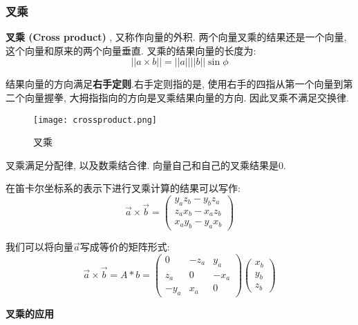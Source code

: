 \documentclass[openany]{progbookcn}
\begin{document}
\subsubsection{叉乘}

\textbf{叉乘 (Cross product) }, 又称作向量的外积. 两个向量叉乘的结果还是一个向量, 这个向量和原来的两个向量垂直. 叉乘的结果向量的长度为: 
\begin{equation}
	||a\times b||=||a||||b||\sin\phi
\end{equation}

结果向量的方向满足\textbf{右手定则}.右手定则指的是, 使用右手的四指从第一个向量到第二个向量握拳, 大拇指指向的方向是叉乘结果向量的方向. 因此叉乘不满足交换律. 

\begin{figure}[H]
	\centering
	\texttt{[image: crossproduct.png]}
	\caption{叉乘}
	\label{fig:corssproduct}
\end{figure}

叉乘满足分配律, 以及数乘结合律. 向量自己和自己的叉乘结果是0.

在笛卡尔坐标系的表示下进行叉乘计算的结果可以写作: 
\begin{equation}
	\overrightarrow{a} \times \overrightarrow{b} = \begin{pmatrix}
		y_az_b-y_bz_a\\ 
		z_ax_b-x_az_b\\
		x_ay_b-y_ax_b
	\end{pmatrix}
\end{equation}

我们可以将向量$	\overrightarrow{a}$写成等价的矩阵形式: 
\begin{equation}
	\overrightarrow{a} \times \overrightarrow{b} = 
	A*b=\begin{pmatrix}
		0&-z_a&y_a\\
		z_a& 0& -x_a\\
		-y_a & x_a & 0
	\end{pmatrix} 
	\begin{pmatrix}
		x_b\\
		y_b\\
		z_b
	\end{pmatrix} 
\end{equation}

\textbf{叉乘的应用}
\end{document}
